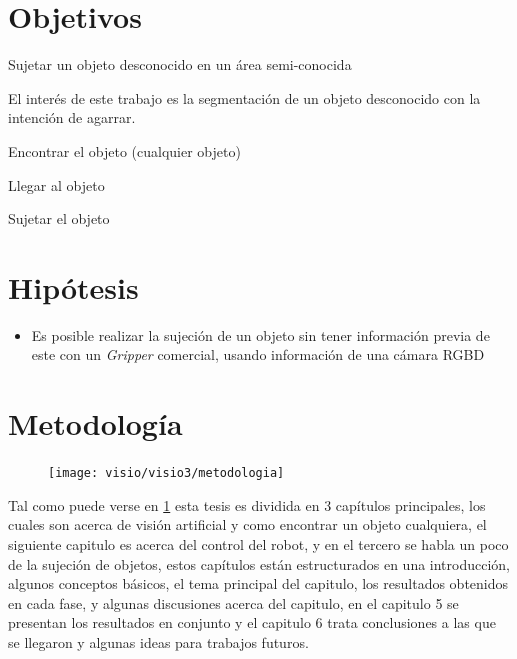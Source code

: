 \section{Objetivos}

\begin{prop}
	\item Sujetar un objeto desconocido en un área semi-conocida \label{objesp:1}
\end{prop} 
El interés de este trabajo es la segmentación de un objeto desconocido con la intención de agarrar.

\begin{prop}
	\item Encontrar el objeto (cualquier objeto) \label{objpart:1}
	\item Llegar al objeto \label{objpart:2}
	\item Sujetar el objeto \label{objpart:3}
\end{prop} 













\section{Hipótesis}
\begin{itemize}
	\item Es posible realizar la sujeción de un objeto sin tener información previa de este con un \textit{Gripper} comercial, usando información de una cámara RGBD
\end{itemize}

\section{Metodología}
\begin{figure}[h]
	\centering
	\texttt{[image: visio/visio3/metodologia]}
	\caption{}
	\label{fig:metodologia}
\end{figure}

Tal como puede verse en \cref{fig:metodologia} esta tesis es dividida en 3 capítulos principales, los cuales son acerca de visión artificial y como encontrar un objeto cualquiera, el siguiente capitulo es acerca del control del robot, y en el tercero se habla un poco de la sujeción de objetos, estos capítulos están estructurados en una introducción, algunos conceptos básicos, el tema principal del capitulo, los resultados obtenidos en cada fase, y algunas discusiones acerca del capitulo, en el capitulo 5 se presentan los resultados en conjunto y el capitulo 6 trata conclusiones a las que se llegaron y algunas ideas para trabajos futuros.

